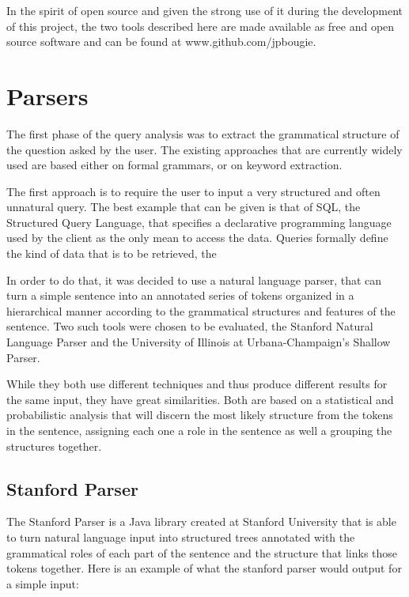 In the spirit of open source and given the strong use of it during the development of this project, the two tools described here are made available as free and open source software and can be found at www.github.com/jpbougie.


\section{Parsers} %
\label{sec:parsers}

The first phase of the query analysis was to extract the grammatical structure of the question asked by the user. The existing approaches that are currently widely used are based either on formal grammars, or on keyword extraction.

The first approach is to require the user to input a very structured and often unnatural query. The best example that can be given is that of SQL, the Structured Query Language, that specifies a declarative programming language used by the client as the only mean to access the data. Queries formally define the kind of data that is to be retrieved, the 


 In order to do that, it was decided to use a natural language parser, that can turn a simple sentence into an annotated series of tokens organized in a hierarchical manner according to the grammatical structures and features of the sentence. Two such tools were chosen to be evaluated, the Stanford Natural Language Parser and the University of Illinois at Urbana-Champaign's Shallow Parser. 

While they both use different techniques and thus produce different results for the same input, they have great similarities. Both are based on a statistical and probabilistic analysis that will discern the most likely structure from the tokens in the sentence, assigning each one a role in the sentence as well a grouping the structures together.

\subsection{Stanford Parser} %
\label{sub:stanford_parser}
The Stanford Parser is a Java library created at Stanford University that is able to turn natural language input into structured trees annotated with the grammatical roles of each part of the sentence and the structure that links those tokens together. Here is an example of what the stanford parser would output for a simple input:

